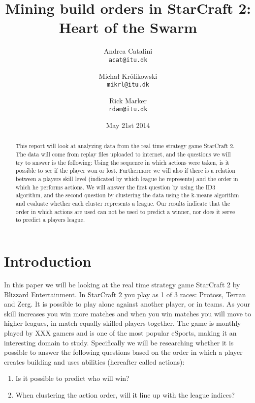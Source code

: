 \documentclass[a4paper,11pt]{article}
\begin{document}
\graphicspath{ {./images/} }
\date{May 21st 2014}
\title{Mining build orders in StarCraft 2: Heart of the Swarm}

\author{Andrea Catalini\\
\texttt{acat@itu.dk}
\and Michał Królikowski\\
\texttt{mikrl@itu.dk}
\and Rick Marker\\
\texttt{rdam@itu.dk}}

\clearpage\maketitle
\thispagestyle{empty}
\setcounter{page}{1}
\begin{abstract}
This report will look at analyzing data from the real time strategy game StarCraft 2. The data will come from replay files uploaded to internet, and the questions we will try to answer is the following: Using the sequence in which actions were taken, is it possible to see if the player won or lost. Furthermore we will also if there is a relation between a players skill level (indicated by which league he represents) and the order in which he performs actions. We will answer the first question by using the ID3 algorithm, and the second question by clustering the data using the k-means algorithm and evaluate whether each cluster represents a league. Our results indicate that the order in which actions are used can not be used to predict a winner, nor does it serve to predict a players league.
\end{abstract}


\section{Introduction}
In this paper we will be looking at the real time strategy game StarCraft 2 by Blizzard Entertainment. 
In StarCraft 2 you play as 1 of 3 races: Protoss, Terran and Zerg. It is possible to play alone against another player, or in teams. As your skill increases you win more matches and when you win matches you will move to higher leagues, in match equally skilled players together. The game is monthly played by XXX gamers and is one of the most popular eSports, making it an interesting domain to study.
Specifically we will be researching whether it is possible to answer the following questions based on the order in which a player creates building and uses abilities (hereafter called actions):
\begin{enumerate}
\item Is it possible to predict who will win?\label{q:win}
\item When clustering the action order, will it line up with the league indices?\label{q:league}
\end{enumerate}
\end{document}
